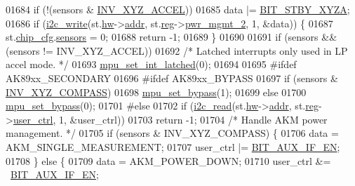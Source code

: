 \begin{DoxyCode}
01684     \textcolor{keywordflow}{if} (!(sensors & \hyperlink{group___d_r_i_v_e_r_s_gaa03f025a17ed491e70b88274e89c75c5}{INV\_XYZ\_ACCEL}))
01685         data |= \hyperlink{inv__mpu_8c_a04a57159e34387dafe9b86b171c4654c}{BIT\_STBY\_XYZA};
01686     \textcolor{keywordflow}{if} (\hyperlink{_i2_c_8c_ac0f145afe8d662af199043939f4398d6}{i2c\_write}(st.\hyperlink{structgyro__state__s_a5bac30a96752691e4cc723735060e360}{hw}->\hyperlink{structhw__s_a4c34a946600e9d68b6355d23f54d291b}{addr}, st.\hyperlink{structgyro__state__s_ae857e1285c583b7438a208edd691a38e}{reg}->\hyperlink{structgyro__reg__s_adc9ae0e35f199b3349174ac09e219ecb}{pwr\_mgmt\_2}, 1, &data)) \{
01687         st.\hyperlink{structgyro__state__s_ac895217592e2084bd520b0be8e9d20ee}{chip\_cfg}.\hyperlink{structchip__cfg__s_aaa21c01566947e7007476657cb614e3f}{sensors} = 0;
01688         \textcolor{keywordflow}{return} -1;
01689     \}
01690 
01691     \textcolor{keywordflow}{if} (sensors && (sensors != INV\_XYZ\_ACCEL))
01692         \textcolor{comment}{/* Latched interrupts only used in LP accel mode. */}
01693         \hyperlink{group___d_r_i_v_e_r_s_ga653cb855300bff9285ce4b8dca6a503b}{mpu\_set\_int\_latched}(0);
01694 
01695 \textcolor{preprocessor}{#ifdef AK89xx\_SECONDARY}
01696 \textcolor{preprocessor}{#ifdef AK89xx\_BYPASS}
01697     \textcolor{keywordflow}{if} (sensors & \hyperlink{group___d_r_i_v_e_r_s_ga7fc9c1dbdcb2ac8cc2a4128a5799482a}{INV\_XYZ\_COMPASS})
01698         \hyperlink{group___d_r_i_v_e_r_s_ga36f70f38371b48d81094d3b061233e15}{mpu\_set\_bypass}(1);
01699     \textcolor{keywordflow}{else}
01700         \hyperlink{group___d_r_i_v_e_r_s_ga36f70f38371b48d81094d3b061233e15}{mpu\_set\_bypass}(0);
01701 \textcolor{preprocessor}{#else}
01702     \textcolor{keywordflow}{if} (\hyperlink{_i2_c_8c_ac2d47e7a6c76f93f9b537c31a2986e7b}{i2c\_read}(st.\hyperlink{structgyro__state__s_a5bac30a96752691e4cc723735060e360}{hw}->\hyperlink{structhw__s_a4c34a946600e9d68b6355d23f54d291b}{addr}, st.\hyperlink{structgyro__state__s_ae857e1285c583b7438a208edd691a38e}{reg}->\hyperlink{structgyro__reg__s_ad8384710853dc1f9580b9ff19e87efbc}{user\_ctrl}, 1, &user\_ctrl))
01703         \textcolor{keywordflow}{return} -1;
01704     \textcolor{comment}{/* Handle AKM power management. */}
01705     \textcolor{keywordflow}{if} (sensors & INV\_XYZ\_COMPASS) \{
01706         data = AKM\_SINGLE\_MEASUREMENT;
01707         user\_ctrl |= \hyperlink{inv__mpu_8c_abcdedbd3098140aa14ad17bcaca8e176}{BIT\_AUX\_IF\_EN};
01708     \} \textcolor{keywordflow}{else} \{
01709         data = AKM\_POWER\_DOWN;
01710         user\_ctrl &= ~\hyperlink{inv__mpu_8c_abcdedbd3098140aa14ad17bcaca8e176}{BIT\_AUX\_IF\_EN};

\end{DoxyCode}
